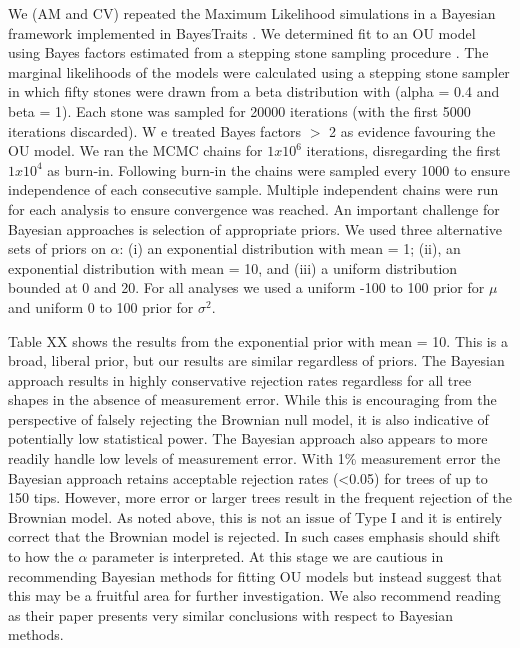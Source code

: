 \documentclass[a4paper,12pt]{article}
\begin{document}
\begin{enumerate}[(i)]
	    We (AM and CV) repeated the Maximum Likelihood simulations in a Bayesian framework implemented in BayesTraits \citep{pagel2013bayestraits}. 
      We determined fit to an OU model using Bayes factors estimated from a stepping stone sampling procedure \citep{xie2010improving}. 
      The marginal likelihoods of the models were calculated using a stepping stone sampler in which fifty stones were drawn from a beta distribution with (alpha = 0.4 and beta = 1). 
      Each stone was sampled for 20000 iterations (with the first 5000 iterations discarded). W
      e treated Bayes factors $>$ 2 as evidence favouring the OU model. We ran the MCMC chains for $1x10^6$ iterations, disregarding the first $1x10^4$ as burn-in. Following burn-in the chains were sampled every 1000 to ensure independence of each consecutive sample. 
      Multiple independent chains were run for each analysis to ensure convergence was reached. 
      An important challenge for Bayesian approaches is selection of appropriate priors. We used three alternative sets of priors on $\alpha$: (i) an exponential distribution with mean = 1; (ii), an exponential distribution with mean = 10, and (iii) a uniform distribution bounded at 0 and 20. 
      For all analyses we used a uniform -100 to 100 prior for $\mu$ and uniform 0 to 100 prior for $\sigma^2$. 
      
      Table XX shows the results from the exponential prior with mean = 10. This is a broad, liberal prior, but our results are similar regardless of priors. %
      The Bayesian approach results in highly conservative rejection rates regardless for all tree shapes in the absence of measurement error. 
      While this is encouraging from the perspective of falsely rejecting the Brownian null model, it is also indicative of potentially low statistical power. 
      The Bayesian approach also appears to more readily handle low levels of measurement error. 
      With 1\% measurement error the Bayesian approach retains acceptable rejection rates (\textless 0.05) for trees of up to 150 tips. 
      However, more error or larger trees result in the frequent rejection of the Brownian model. 
      As noted above, this is not an issue of Type I and it is entirely correct that the Brownian model is rejected. 
      In such cases emphasis should shift to how the $\alpha$ parameter is interpreted. 
      At this stage we are cautious in recommending Bayesian methods for fitting OU models but instead suggest that this may be a fruitful area for further investigation. 
      We also recommend reading \citet{pennell2015model} as their paper presents very similar conclusions with respect to Bayesian methods.
    \end{enumerate}
\end{document}
